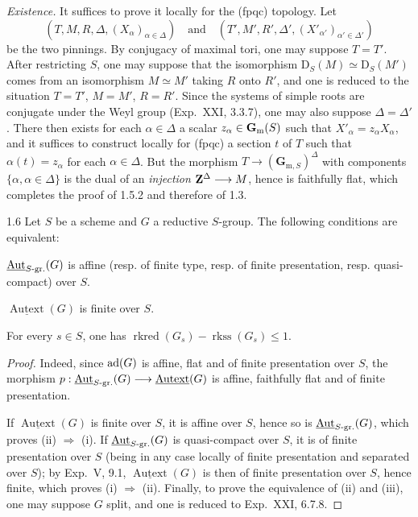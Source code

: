 \label{XXIV.1.5.2}\textit{Existence.} It suffices to prove it locally for the (fpqc) topology. Let
\[
(T,M,R,\Delta,(X_\alpha)_{\alpha\in\Delta})\quad\text{and}\quad
(T',M',R',\Delta',(X'_{\alpha'})_{\alpha'\in\Delta'})
\]
be the two pinnings. By conjugacy of maximal tori, one may suppose $T=T'$. After restricting $S$, one may suppose that the isomorphism $\mathrm D_S(M)\simeq\mathrm D_S(M')$ comes from an isomorphism $M\simeq M'$ taking $R$ onto $R'$, and one is reduced to the situation $T=T'$, $M=M'$, $R=R'$. Since the systems of simple roots are conjugate under the Weyl group (Exp.~XXI, 3.3.7), one may also suppose $\Delta=\Delta'$. There then exists for each $\alpha\in\Delta$ a scalar $z_\alpha\in\mathbf{G}_{\mathrm{m}}(S)$ such that $X'_\alpha=z_\alpha X_\alpha$, and it suffices to construct locally for (fpqc) a section $t$ of $T$ such that $\alpha(t)=z_\alpha$ for each $\alpha\in\Delta$. But the morphism $T\to(\mathbf G_{\mathrm m,S})^\Delta$ with components $\{\alpha,\alpha\in\Delta\}$ is the dual of an \emph{injection} $\mathbf{Z}^\Delta\longrightarrow M$, hence is faithfully flat, which completes the proof of 1.5.2 and therefore of 1.3.

\begin{corollary}{1.6}\label{XXIV.1.6}
Let $S$ be a scheme and $G$ a reductive $S$-group. The following conditions are equivalent:
\begin{enumeratei}
\item $\underline{\operatorname{Aut}}_{S\text{-gr.}}(G)$ is affine (resp. of finite type, resp. of finite presentation, resp. quasi-compact) over $S$.
\item $\underline{\operatorname{Autext}}(G)$ is finite over $S$.
\item For every $s\in S$, one has $\operatorname{rkred}(G_s)-\operatorname{rkss}(G_s)\leq1$.
\end{enumeratei}
\end{corollary}
\begin{proof}
Indeed, since $\operatorname{ad}(G)$ is affine, flat and of finite presentation over $S$, the morphism $p:\underline{\operatorname{Aut}}_{S\text{-gr.}}(G)\longrightarrow\underline{\operatorname{Autext}}(G)$ is affine, faithfully flat and of finite presentation.

If $\underline{\operatorname{Autext}}(G)$ is finite over $S$, it is affine over $S$, hence so is $\underline{\operatorname{Aut}}_{S\text{-gr.}}(G)$, which proves (ii) $\Rightarrow$ (i). If $\underline{\operatorname{Aut}}_{S\text{-gr.}}(G)$ is quasi-compact over $S$, it is of finite presentation over $S$ (being in any case locally of finite presentation and separated over $S$); by Exp.~V, 9.1, $\underline{\operatorname{Autext}}(G)$ is then of finite presentation over $S$, hence finite, which proves (i) $\Rightarrow$ (ii). Finally, to prove the equivalence of (ii) and (iii), one may suppose $G$ split, and one is reduced to Exp.~XXI, 6.7.8.
\end{proof}

